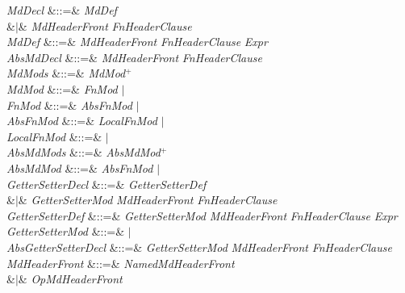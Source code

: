\begin{Grammar}
\emph{MdDecl} &::=& \emph{MdDef} \\
&$|$&
  
\emph{MdHeaderFront} \emph{FnHeaderClause} \\

\emph{MdDef}  &::=&  
\emph{MdHeaderFront} \emph{FnHeaderClause}
\EXP{=} \emph{Expr} \\

\emph{AbsMdDecl} &::=&
  
\emph{MdHeaderFront} \emph{FnHeaderClause} \\

\emph{MdMods} &::=& \emph{MdMod}$^+$\\

\emph{MdMod} &::=& \emph{FnMod} $|$ \\

\emph{FnMod} &::=& \emph{AbsFnMod} $|$ \\

\emph{AbsFnMod} &::=& \emph{LocalFnMod} $|$
\\

\emph{LocalFnMod} &::=&  $|$ \\

\emph{AbsMdMods} &::=& \emph{AbsMdMod}$^+$\\

\emph{AbsMdMod} &::=& \emph{AbsFnMod} $|$ \\

\emph{GetterSetterDecl} &::=& \emph{GetterSetterDef} \\
&$|$&  
\emph{GetterSetterMod} \emph{MdHeaderFront} \emph{FnHeaderClause} \\

\emph{GetterSetterDef}  &::=&  \emph{GetterSetterMod}
\emph{MdHeaderFront} \emph{FnHeaderClause}
\EXP{=} \emph{Expr} \\

\emph{GetterSetterMod} &::=&  $|$ \\

\emph{AbsGetterSetterDecl} &::=&  
 \emph{GetterSetterMod} \emph{MdHeaderFront} \emph{FnHeaderClause} \\

\emph{MdHeaderFront}  &::=& \emph{NamedMdHeaderFront}\\
&$|$& \emph{OpMdHeaderFront} \\


\end{Grammar}
